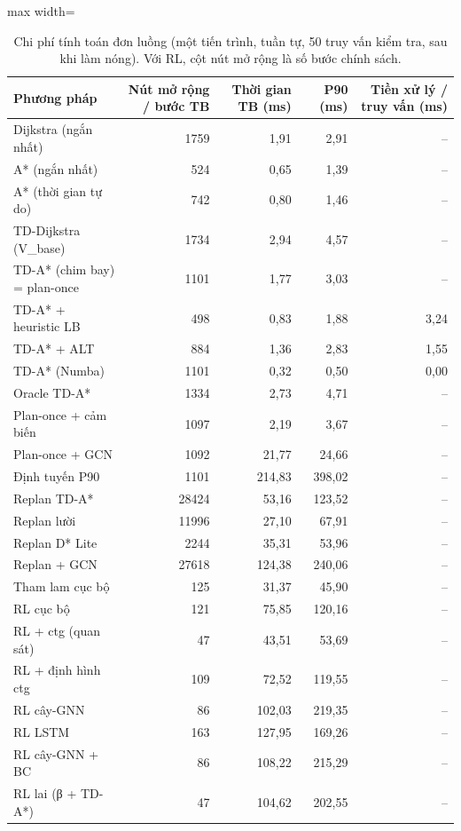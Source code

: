 \begin{table}[!htbp]
\centering
\small
\caption{Chi phí tính toán đơn luồng (một tiến trình, tuần tự, 50 truy vấn kiểm tra, sau khi làm nóng). Với RL, cột nút mở rộng là số bước chính sách.}
\label{tab:tab_runtime_single}
\begin{adjustbox}{max width=\linewidth}
\begin{tabular}{lrrrr}
\toprule
Phương pháp & Nút mở rộng / bước TB & Thời gian TB (ms) & P90 (ms) & Tiền xử lý / truy vấn (ms) \\
\midrule
Dijkstra (ngắn nhất) & 1759 & 1{,}91 & 2{,}91 & -- \\
A* (ngắn nhất) & 524 & 0{,}65 & 1{,}39 & -- \\
A* (thời gian tự do) & 742 & 0{,}80 & 1{,}46 & -- \\
TD-Dijkstra (V\_base) & 1734 & 2{,}94 & 4{,}57 & -- \\
TD-A* (chim bay) = plan-once & 1101 & 1{,}77 & 3{,}03 & -- \\
TD-A* + heuristic LB & 498 & 0{,}83 & 1{,}88 & 3{,}24 \\
TD-A* + ALT & 884 & 1{,}36 & 2{,}83 & 1{,}55 \\
TD-A* (Numba) & 1101 & 0{,}32 & 0{,}50 & 0{,}00 \\
Oracle TD-A* & 1334 & 2{,}73 & 4{,}71 & -- \\
Plan-once + cảm biến & 1097 & 2{,}19 & 3{,}67 & -- \\
Plan-once + GCN & 1092 & 21{,}77 & 24{,}66 & -- \\
Định tuyến P90 & 1101 & 214{,}83 & 398{,}02 & -- \\
Replan TD-A* & 28424 & 53{,}16 & 123{,}52 & -- \\
Replan lười & 11996 & 27{,}10 & 67{,}91 & -- \\
Replan D* Lite & 2244 & 35{,}31 & 53{,}96 & -- \\
Replan + GCN & 27618 & 124{,}38 & 240{,}06 & -- \\
Tham lam cục bộ & 125 & 31{,}37 & 45{,}90 & -- \\
RL cục bộ & 121 & 75{,}85 & 120{,}16 & -- \\
RL + ctg (quan sát) & 47 & 43{,}51 & 53{,}69 & -- \\
RL + định hình ctg & 109 & 72{,}52 & 119{,}55 & -- \\
RL cây-GNN & 86 & 102{,}03 & 219{,}35 & -- \\
RL LSTM & 163 & 127{,}95 & 169{,}26 & -- \\
RL cây-GNN + BC & 86 & 108{,}22 & 215{,}29 & -- \\
RL lai (β + TD-A*) & 47 & 104{,}62 & 202{,}55 & -- \\
\bottomrule
\end{tabular}
\end{adjustbox}
\end{table}
